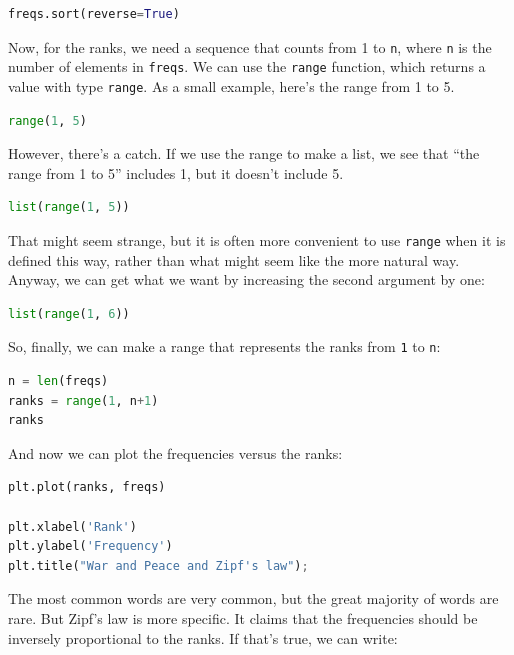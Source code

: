 \begin{lstlisting}[language=Python,style=source]
freqs.sort(reverse=True)
\end{lstlisting}

Now, for the ranks, we need a sequence that counts from 1 to
\passthrough{\lstinline!n!}, where \passthrough{\lstinline!n!} is the
number of elements in \passthrough{\lstinline!freqs!}. We can use the
\passthrough{\lstinline!range!} function, which returns a value with
type \passthrough{\lstinline!range!}. As a small example, here's the
range from 1 to 5.

\begin{lstlisting}[language=Python,style=source]
range(1, 5)
\end{lstlisting}

However, there's a catch. If we use the range to make a list, we see
that ``the range from 1 to 5'' includes 1, but it doesn't include 5.

\begin{lstlisting}[language=Python,style=source]
list(range(1, 5))
\end{lstlisting}

That might seem strange, but it is often more convenient to use
\passthrough{\lstinline!range!} when it is defined this way, rather than
what might seem like the more natural way. Anyway, we can get what we
want by increasing the second argument by one:

\begin{lstlisting}[language=Python,style=source]
list(range(1, 6))
\end{lstlisting}

So, finally, we can make a range that represents the ranks from
\passthrough{\lstinline!1!} to \passthrough{\lstinline!n!}:

\begin{lstlisting}[language=Python,style=source]
n = len(freqs)
ranks = range(1, n+1)
ranks
\end{lstlisting}

And now we can plot the frequencies versus the ranks:

\begin{lstlisting}[language=Python,style=source]
plt.plot(ranks, freqs)

plt.xlabel('Rank')
plt.ylabel('Frequency')
plt.title("War and Peace and Zipf's law");
\end{lstlisting}

The most common words are very common, but the great majority of words
are rare. But Zipf's law is more specific. It claims that the
frequencies should be inversely proportional to the ranks. If that's
true, we can write:

